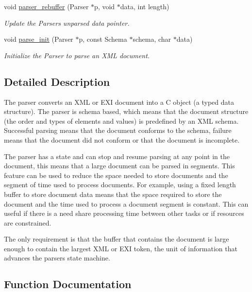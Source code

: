 \begin{DoxyCompactItemize}
void \hyperlink{group__parse_gad168a73b5bc04a6a128f4c8756abf080}{parser\+\_\+rebuffer} (Parser $\ast$p, void $\ast$data, int length)
\begin{DoxyCompactList}\small\item\em Update the Parser\textquotesingle{}s unparsed data pointer. \end{DoxyCompactList}\item 
void \hyperlink{group__parse_gad28bad9bf84823a7c937a544a462db55}{parse\+\_\+init} (Parser $\ast$p, const Schema $\ast$schema, char $\ast$data)
\begin{DoxyCompactList}\small\item\em Initialize the Parser to parse an X\+ML document. \end{DoxyCompactList}\end{DoxyCompactItemize}


\subsection{Detailed Description}
The parser converts an X\+ML or E\+XI document into a C object (a typed data structure). The parser is schema based, which means that the document structure (the order and types of elements and values) is predefined by an X\+ML schema. Successful parsing means that the document conforms to the schema, failure means that the document did not conform or that the document is incomplete.

The parser has a state and can stop and resume parsing at any point in the document, this means that a large document can be parsed in segments. This feature can be used to reduce the space needed to store documents and the segment of time used to process documents. For example, using a fixed length buffer to store document data means that the space required to store the document and the time used to process a document segment is constant. This can useful if there is a need share processing time between other tasks or if resources are constrained.

The only requirement is that the buffer that contains the document is large enough to contain the largest X\+ML or E\+XI token, the unit of information that advances the parser\textquotesingle{}s state machine. 

\subsection{Function Documentation}
\mbox{\label{group__parse_ga69faec40afb94556fb457d8a94db7eed}} 
